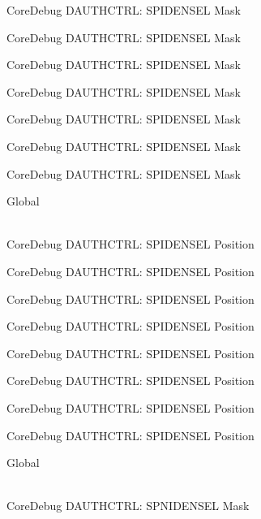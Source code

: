 \begin{DoxyRefList}
\label{deprecated__deprecated000146}%
%
Core\+Debug DAUTHCTRL\+: SPIDENSEL Mask 

\label{deprecated__deprecated000222}%
%
Core\+Debug DAUTHCTRL\+: SPIDENSEL Mask 

\label{deprecated__deprecated000285}%
%
Core\+Debug DAUTHCTRL\+: SPIDENSEL Mask 

\label{deprecated__deprecated000364}%
%
Core\+Debug DAUTHCTRL\+: SPIDENSEL Mask 

\label{deprecated__deprecated000440}%
%
Core\+Debug DAUTHCTRL\+: SPIDENSEL Mask 

\label{deprecated__deprecated000543}%
%
Core\+Debug DAUTHCTRL\+: SPIDENSEL Mask 

\label{deprecated__deprecated000645}%
%
Core\+Debug DAUTHCTRL\+: SPIDENSEL Mask  
\item[{\parbox[t]{\linewidth}{Global \doxylink{group___c_m_s_i_s___s_c_b_ga587610b7ac18292de47bf9d675b0b88c}{Core\+Debug\+\_\+\+DAUTHCTRL\+\_\+\+SPIDENSEL\+\_\+\+Pos} }}]\hfill \\
\label{deprecated__deprecated000091}%
%
Core\+Debug DAUTHCTRL\+: SPIDENSEL Position 

\label{deprecated__deprecated000145}%
%
Core\+Debug DAUTHCTRL\+: SPIDENSEL Position 

\label{deprecated__deprecated000221}%
%
Core\+Debug DAUTHCTRL\+: SPIDENSEL Position 

\label{deprecated__deprecated000284}%
%
Core\+Debug DAUTHCTRL\+: SPIDENSEL Position 

\label{deprecated__deprecated000363}%
%
Core\+Debug DAUTHCTRL\+: SPIDENSEL Position 

\label{deprecated__deprecated000439}%
%
Core\+Debug DAUTHCTRL\+: SPIDENSEL Position 

\label{deprecated__deprecated000542}%
%
Core\+Debug DAUTHCTRL\+: SPIDENSEL Position 

\label{deprecated__deprecated000644}%
%
Core\+Debug DAUTHCTRL\+: SPIDENSEL Position  
\item[{\parbox[t]{\linewidth}{Global \doxylink{group___c_m_s_i_s___s_c_b_gaabb5d6c750c9ec50254134ece2111dcd}{Core\+Debug\+\_\+\+DAUTHCTRL\+\_\+\+SPNIDENSEL\+\_\+\+Msk} }}]\hfill \\
\label{deprecated__deprecated000088}%
%
Core\+Debug DAUTHCTRL\+: SPNIDENSEL Mask 


\end{DoxyRefList}
